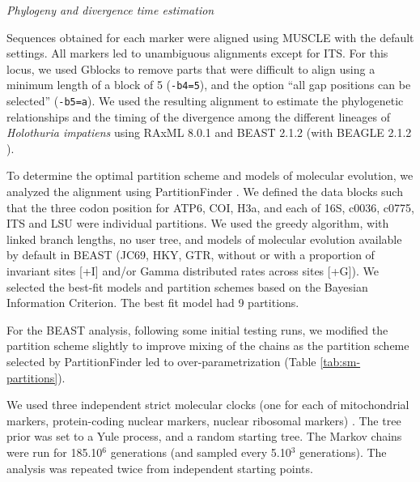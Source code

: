 \documentclass[12pt,letterpaper]{article}\usepackage[]{graphicx}\usepackage[]{color}
\renewcommand{\subsection}[1]{%
\bigskip
\begin{center}
\begin{large}
\normalfont\itshape #1
\end{large}
\end{center}}
\begin{document}


\subsection{Phylogeny and divergence time estimation}

Sequences obtained for each marker were aligned using MUSCLE \citep{Edgar2004}
with the default settings. All markers led to unambiguous alignments except for
ITS. For this locus, we used Gblocks \citep{Castresana2000} to remove parts that
were difficult to align using a minimum length of a block of 5 (\texttt{-b4=5}),
and the option ``all gap positions can be selected'' (\texttt{-b5=a}). We used
the resulting alignment to estimate the phylogenetic relationships and the
timing of the divergence among the different lineages of \textit{Holothuria
  impatiens} using RAxML 8.0.1 \citep{Stamatakis2014} and BEAST 2.1.2
\citep{Bouckaert2014} (with BEAGLE 2.1.2 \citep{Ayres2012}).

To determine the optimal partition scheme and models of molecular evolution, we
analyzed the alignment using PartitionFinder \citep{Lanfear2012}. We defined the
data blocks such that the three codon position for ATP6, COI, H3a, and each of
16S, c0036, c0775, ITS and LSU were individual partitions. We used the greedy
algorithm, with linked branch lengths, no user tree, and models of molecular
evolution available by default in BEAST (JC69, HKY, GTR, without or with a
proportion of invariant sites [+I] and/or Gamma distributed rates across sites
[+G]). We selected the best-fit models and partition schemes based on the
Bayesian Information Criterion. The best fit model had 9 partitions.

For the BEAST analysis, following some initial testing runs, we modified the
partition scheme slightly to improve mixing of the chains as the partition
scheme selected by PartitionFinder led to over-parametrization (Table
\ref{tab:sm-partitions}).

We used three independent strict molecular clocks (one for each of mitochondrial
markers, protein-coding nuclear markers, nuclear ribosomal markers)
\citep{Hasegawa1985}. The tree prior was set to a Yule process, and a random
starting tree. The Markov chains were run for 185.10$^6$ generations (and
sampled every 5.10$^3$ generations). The analysis was repeated twice from
independent starting points.
\end{document}
